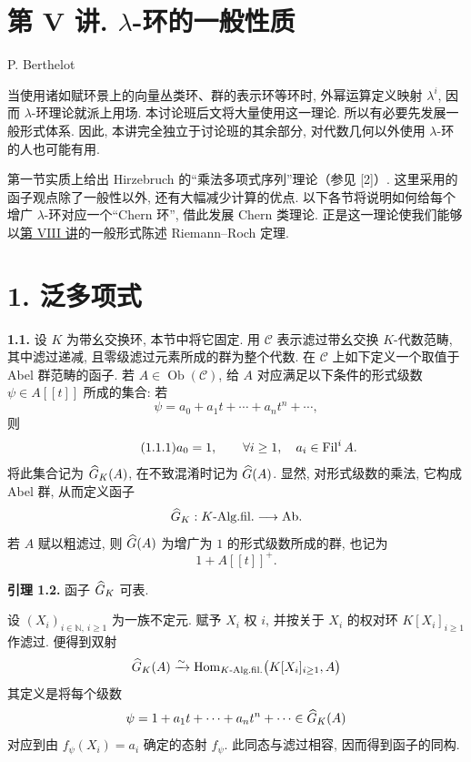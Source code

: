 \section*{第 V 讲. \(\lambda\)-环的一般性质}
\begin{center}
P. Berthelot
\end{center}

当使用诸如赋环景上的向量丛类环、群的表示环等环时, 外幂运算定义映射 \(\lambda^i\), 因而 \(\lambda\)-环理论就派上用场. 本讨论班后文将大量使用这一理论. 所以有必要先发展一般形式体系. 因此, 本讲完全独立于讨论班的其余部分, 对代数几何以外使用 \(\lambda\)-环的人也可能有用.

第一节实质上给出 Hirzebruch 的“乘法多项式序列”理论（参见 [2]）. 这里采用的函子观点除了一般性以外, 还有大幅减少计算的优点. 以下各节将说明如何给每个增广 \(\lambda\)-环对应一个“Chern 环”, 借此发展 Chern 类理论. 正是这一理论使我们能够以\hyperlink{sga6.e08.expose}{第 VIII 讲}的一般形式陈述 Riemann--Roch 定理.

\section*{1. 泛多项式}

\textbf{1.1.} 设 \(K\) 为带幺交换环, 本节中将它固定. 用 \(\mathcal C\) 表示滤过带幺交换 \(K\)-代数范畴, 其中滤过递减, 且零级滤过元素所成的群为整个代数. 在 \(\mathcal C\) 上如下定义一个取值于 Abel 群范畴的函子. 若 \(A\in\operatorname{Ob}(\mathcal C)\), 给 \(A\) 对应满足以下条件的形式级数 \(\psi\in A[[t]]\) 所成的集合: 若
\[
  \psi=a_0+a_1t+\cdots+a_nt^n+\cdots ,
\]
则
\begin{equation}\tag{1.1.1}
  a_0=1,\qquad \forall i\geq 1,\quad a_i\in \operatorname{Fil}^i A .
\end{equation}
将此集合记为 \(\widehat G_K(A)\), 在不致混淆时记为 \(\widehat G(A)\). 显然, 对形式级数的乘法, 它构成 Abel 群, 从而定义函子
\[
  \widehat G_K:K\text{-Alg.fil.}\longrightarrow \mathrm{Ab}.
\]
若 \(A\) 赋以粗滤过, 则 \(\widehat G(A)\) 为增广为 \(1\) 的形式级数所成的群, 也记为
\[
  1+A[[t]]^+.
\]

\textbf{引理 1.2.} 函子 \(\widehat G_K\) 可表.

设 \((X_i)_{i\in\mathbb N,\ i\geq 1}\) 为一族不定元. 赋予 \(X_i\) 权 \(i\), 并按关于 \(X_i\) 的权对环 \(K[X_i]_{i\geq 1}\) 作滤过. 便得到双射
\[
  \widehat G_K(A)\xrightarrow{\sim}
  \operatorname{Hom}_{K\text{-Alg.fil.}}\bigl(K[X_i]_{i\geq 1},A\bigr)
\]
其定义是将每个级数
\[
  \psi=1+a_1t+\cdots+a_nt^n+\cdots\in\widehat G_K(A)
\]
对应到由 \(f_\psi(X_i)=a_i\) 确定的态射 \(f_\psi\). 此同态与滤过相容, 因而得到函子的同构.

